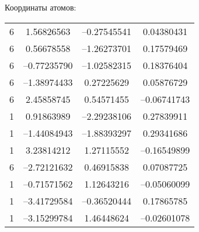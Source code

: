 {Координаты атомов:
\begin{center}
\begin{tabular}{cccc}
6& 1.56826563& --0.27545541& 0.04380431\\
6& 0.56678558& --1.26273701& 0.17579469\\
6& --0.77235790& --1.02582315& 0.18376404\\
6& --1.38974433& 0.27225629 &0.05876729\\
6& 2.45858745& 0.54571455 &--0.06741743\\
1& 0.91863989& --2.29238106& 0.27839911\\
1& --1.44084943& --1.88393297& 0.29341686\\
1& 3.23814212& 1.27115552 &--0.16549899\\
6& --2.72121632& 0.46915838 &0.07087725\\
1& --0.71571562& 1.12643216 &--0.05060099\\
1& --3.41729584& --0.36520444& 0.17865785\\
1& --3.15299784& 1.46448624& --0.02601078\\
 \end{tabular}
\end{center}

}
